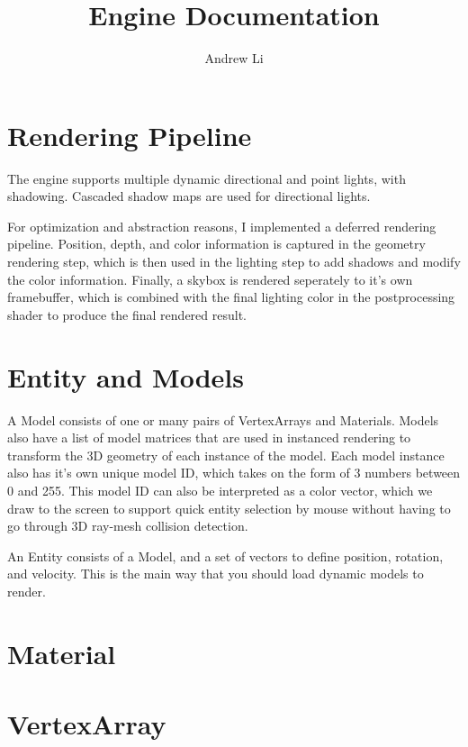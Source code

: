 \documentclass[11pt, headheight=30pt]{scrartcl}
\title{Engine Documentation}
\author{Andrew Li}
\begin{document}
\maketitle

\section{Rendering Pipeline}
The engine supports multiple dynamic directional and point lights, with shadowing. Cascaded shadow maps are used for directional lights. 

For optimization and abstraction reasons, I implemented a deferred rendering pipeline. Position, depth, and color information is captured in the geometry rendering step, which is then used in the lighting step to add shadows and modify the color information. Finally, a skybox is rendered seperately to it's own framebuffer, which is combined with the final lighting color in the postprocessing shader to produce the final rendered result. 

\section{Entity and Models}
A Model consists of one or many pairs of VertexArrays and Materials. Models also have a list of model matrices that are used in instanced rendering to transform the 3D geometry of each instance of the model. Each model instance also has it's own unique model ID, which takes on the form of 3 numbers between 0 and 255. This model ID can also be interpreted as a color vector, which we draw to the screen to support quick entity selection by mouse without having to go through 3D ray-mesh collision detection. 

An Entity consists of a Model, and a set of vectors to define position, rotation, and velocity. This is the main way that you should load dynamic models to render. 

\section{Material}

\section{VertexArray}
\end{document}
